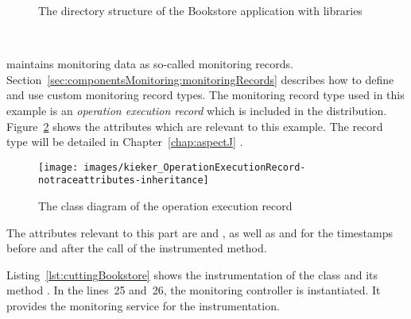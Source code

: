 \begin{figure}[H]
\begin{graybox}
\end{graybox}
\caption{The directory structure of the Bookstore application with \Kieker{} libraries}
\label{fig:KiekerBookstoreExample}
\end{figure}


\quad\

\noindent \Kieker{} maintains monitoring data as  so-called monitoring records. %
Section~\ref{sec:componentsMonitoring:monitoringRecords} describes how to define and use custom monitoring record types. %
The monitoring record type used in this example is an \textit{operation execution record} which %
is included in the \Kieker{} distribution. %
Figure~\ref{fig:OperationExecutionRecordClassDiagram} shows the %
attributes which  are relevant to this example. %
The record type will be detailed in Chapter~\ref{chap:aspectJ} .

\begin{figure}[H]
\begin{centering}
\texttt{[image: images/kieker\_OperationExecutionRecord-notraceattributes-inheritance]}%
\caption{The class diagram of the operation execution record}
\label{fig:OperationExecutionRecordClassDiagram}
\end{centering}
\end{figure}

\noindent The attributes relevant to this part are  and , %
as well as  and  for %
the timestamps before and after the call of the instrumented method.

\enlargethispage{1.2cm}

Listing~\ref{lst:cuttingBookstore} shows the instrumentation of the  class and its method . In the lines~25 and~26, the monitoring controller is instantiated. It provides the monitoring service for the instrumentation.

